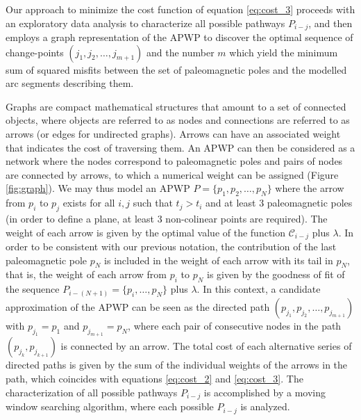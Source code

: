 \documentclass{article} %
\begin{document}
Our approach to minimize the cost function of equation \eqref{eq:cost_3} proceeds with an exploratory data analysis to characterize all possible pathways  $P_{i-j}$, and then employs a graph representation of the APWP to discover the optimal sequence of change-points $(j_1, j_2, \ldots, j_{m+1})$ and the number $m$ which yield the minimum sum of squared misfits between the set of paleomagnetic poles and the modelled arc segments describing them.

Graphs are compact mathematical structures that amount to a set of connected objects, where objects are referred to as nodes and connections are referred to as arrows (or edges for undirected graphs). Arrows can have an associated weight that indicates the cost of traversing them. An APWP can then be considered as a network where the nodes correspond to paleomagnetic poles and pairs of nodes are connected by arrows, to which a numerical weight can be assigned (Figure \ref{fig:graph}). We may thus model an APWP $P = \{ p_1, p_2, \ldots, p_N \}$ where the arrow from $p_i$ to $p_j$ exists for all $i, j$ such that $t_j > t_i$ and at least $3$ paleomagnetic poles (in order to define a plane, at least 3 non-colinear points are required). The weight of each arrow is given by the optimal value of the function $\mathcal C_{i-j}$ plus $\lambda$. In order to be consistent with our previous notation, the contribution of the last paleomagnetic pole $p_N$ is included in the weight of each arrow with its tail in $p_N$, that is, the weight of each arrow from $p_i$ to $p_N$ is given by the goodness of fit of the sequence $P_{i-(N+1)} = \{ p_i, \ldots, p_N \}$ plus $\lambda$. In this context, a candidate approximation of the APWP can be seen as the directed path $(p_{j_1}, p_{j_2}, \ldots, p_{j_{m+1}})$ with $p_{j_1} = p_1$ and $p_{j_{m+1}} = p_N$, where each pair of consecutive nodes in the path $(p_{j_k}, p_{j_{k+1}})$ is connected by an arrow. The total cost of each alternative series of directed paths is given by the sum of the individual weights of the arrows in the path, which coincides with equations \eqref{eq:cost_2} and \eqref{eq:cost_3}. The characterization of all possible pathways $P_{i-j}$ is accomplished by a moving window searching algorithm, where each possible $P_{i-j}$ is analyzed. 
\end{document}
